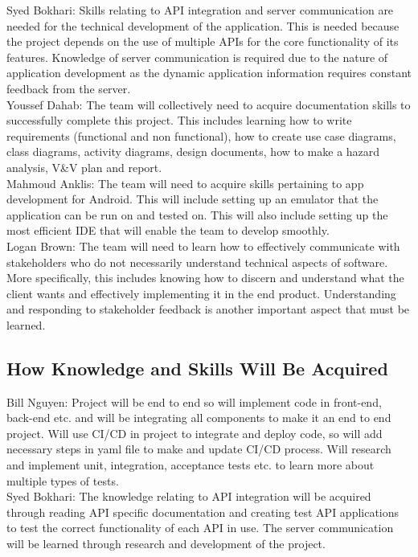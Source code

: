 \documentclass[12pt,letterpaper]{article}
\begin{document}
\noindent Syed Bokhari: Skills relating to API integration and server communication are needed for the technical development of the application. This is needed because the project depends on the use of multiple APIs for the core functionality of its features. Knowledge of server communication is required due to the nature of application development as the dynamic application information requires constant feedback from the server. \\

\noindent Youssef Dahab: The team will collectively need to acquire documentation skills to successfully complete this project. This includes learning how to write requirements (functional and non functional), how to create use case diagrams, class diagrams, activity diagrams, design documents, how to make a hazard analysis, V&V plan and report.\\

\noindent Mahmoud Anklis: The team will need to acquire skills pertaining to app development for Android. This will include setting up an emulator that the application can be run on and tested on. This will also include setting up the most efficient IDE that will enable the team to develop smoothly.\\ 

\noindent Logan Brown: The team will need to learn how to effectively communicate with stakeholders who do not necessarily understand technical aspects of software. More specifically, this includes knowing how to discern and understand what the client wants and effectively implementing it in the end product. Understanding and responding to stakeholder feedback is another important aspect that must be learned.\\

\subsection{How Knowledge and Skills Will Be Acquired}

\noindent Bill Nguyen: Project will be end to end so will implement code in front-end, back-end etc. and will be integrating all components to make it an end to end project. Will use CI/CD in project to integrate and deploy code, so will add necessary steps in yaml file to make and update CI/CD process. Will research and implement unit, integration, acceptance tests etc. to learn more about multiple types of tests. \\

\noindent Syed Bokhari: The knowledge relating to API integration will be acquired through reading API specific documentation and creating test API applications to test the correct functionality of each API in use. The server communication will be learned through research and development of the project.\\
\end{document}

